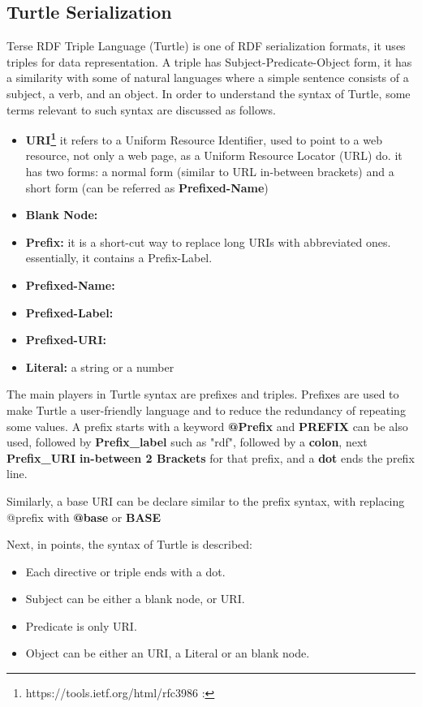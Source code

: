 \subsection{Turtle Serialization}
 Terse RDF Triple Language (Turtle) \cite{W3C:Turtle:Online} is one of RDF serialization formats, it uses triples for data representation. A triple has Subject-Predicate-Object form, it  has a similarity with some of natural languages where a simple sentence consists of a subject, a verb, and an object. In order to understand the syntax of Turtle, some terms  relevant to such syntax are discussed as follows.

\begin{itemize}
    \item \textbf{URI\footnote{https://tools.ietf.org/html/rfc3986
:}} it refers to a Uniform Resource Identifier, used to point to a web resource, not only a web page, as a Uniform Resource Locator (URL) do. it has two forms: a normal form (similar to URL in-between brackets) and a short form (can be referred as \textbf{Prefixed-Name})

    \item \textbf{Blank Node:}
    \item \textbf{Prefix:} it is a  short-cut way to replace long URIs with abbreviated ones. essentially, it contains a Prefix-Label.
        \item \textbf{Prefixed-Name:}
        \item \textbf{Prefixed-Label:}
        \item \textbf{Prefixed-URI:}  
  
    \item \textbf{Literal:} a string or a number
\end{itemize} 

The main players in Turtle syntax are prefixes and triples. Prefixes are used to make Turtle a user-friendly language and to reduce the redundancy of repeating some values. A prefix starts with a keyword \textbf{@Prefix} and \textbf{PREFIX} can be also used, followed by \textbf{Prefix\_label} such as "rdf", followed by a \textbf{colon}, next \textbf{Prefix\_URI} \textbf{in-between  2 Brackets} for that prefix, and a \textbf{dot} ends the prefix line. 


Similarly, a base URI can be declare similar to the prefix syntax, with replacing @prefix with \textbf{@base} or \textbf{BASE} 


Next, in points, the syntax of Turtle is described:
\begin{itemize}
    \item Each directive or triple ends with a dot.
    \item Subject can be either a blank node, or URI. 
    \item Predicate is only URI.
     \item Object can be either an URI, a Literal or an blank node.


\end{itemize} 

